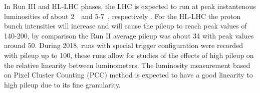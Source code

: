 In Run III and HL-LHC phases, the LHC is expected to run at peak instantenous luminosities of about 2\ \instlumiunit\ and 5-7\ \instlumiunit, respectively \cite{hllhc}.
For the HL-LHC the proton bunch intensities will increase and will cause the pileup to reach peak values of 140-200, by comparison the Run II average pileup was about 34 with peak values around 50. 
During 2018, runs with special trigger configuration were recorded with pileup up to 100, these runs allow for studies of the effects of high pileup on the relative linearity between luminometers.
The luminosity measurement based on Pixel Cluster Counting (PCC) \cite{CMS-PAS-LUM-12-001,CMS-PAS-LUM-13-001,PCC2016_publicplots} method is expected to have a good linearity to high pileup due to its fine granularity.  
